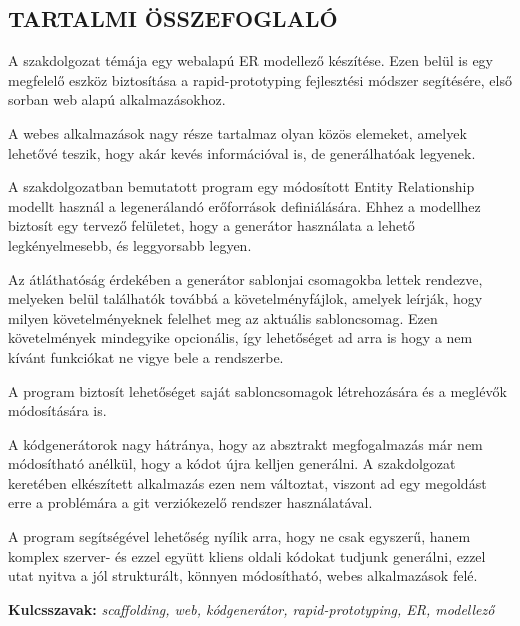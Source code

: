 \begin{center}
\section*{\textbf{\Large \MakeUppercase{\textrm{Tartalmi összefoglaló}}}}
\end{center}


\begin{justify}
A szakdolgozat témája egy webalapú ER modellező készítése. Ezen belül is egy megfelelő eszköz biztosítása a rapid-prototyping fejlesztési módszer segítésére, első sorban web alapú alkalmazásokhoz.

A webes alkalmazások nagy része tartalmaz olyan közös elemeket, amelyek lehetővé teszik, hogy akár kevés információval is, de generálhatóak legyenek.

A szakdolgozatban bemutatott program egy módosított Entity Relationship modellt használ a legenerálandó erőforrások definiálására. Ehhez a modellhez biztosít egy tervező felületet, hogy a generátor használata a lehető legkényelmesebb, és leggyorsabb legyen.

Az átláthatóság érdekében a generátor sablonjai csomagokba lettek rendezve, melyeken belül találhatók továbbá a követelményfájlok, amelyek leírják, hogy milyen követelményeknek felelhet meg az aktuális sabloncsomag. Ezen követelmények mindegyike opcionális, így lehetőséget ad arra is hogy a nem kívánt funkciókat ne vigye bele a rendszerbe.

A program  biztosít lehetőséget saját sabloncsomagok létrehozására és a meglévők módosítására is.

A kódgenerátorok nagy hátránya, hogy az absztrakt megfogalmazás már nem módosítható anélkül, hogy a kódot újra kelljen generálni. A szakdolgozat keretében elkészített alkalmazás ezen nem változtat, viszont ad egy megoldást erre a problémára a git verziókezelő rendszer használatával. 

A program segítségével lehetőség nyílik arra, hogy ne csak egyszerű, hanem komplex szerver- és ezzel együtt kliens oldali kódokat tudjunk generálni, ezzel utat nyitva a jól strukturált, könnyen módosítható, webes alkalmazások felé.
\end{justify}

\vspace{2cm}

{\bf Kulcsszavak:} {\it scaffolding, web, kódgenerátor, rapid-prototyping, ER, modellező}

